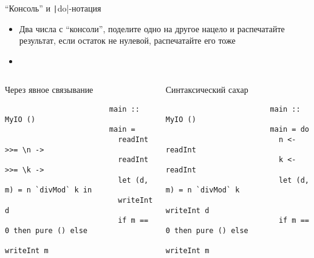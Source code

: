     \begin{frame}[fragile]{``Консоль'' и \texttt|do|-нотация}
        \begin{itemize}
            \item[\todo] Два числа с ``консоли'', поделите одно на другое нацело и распечатайте результат, если остаток не нулевой, распечатайте его тоже
            \item[\answer] \pause
        \end{itemize}
        \vspace{-1.7em}
        \begin{columns}[onlytextwidth]
            \begin{column}[t]{0.485\textwidth}
                \pause
                \begin{block}{Через явное связывание}
                    \begin{verbatim}
                        main :: MyIO ()
                        main =
                          readInt >>= \n ->
                          readInt >>= \k ->
                          let (d, m) = n `divMod` k in
                          writeInt d
                          if m == 0 then pure () else
                            writeInt m
                    \end{verbatim}
                \end{block}
            \end{column}\hfill%
            \begin{column}[t]{0.485\textwidth}
                \pause
                \begin{block}{Синтаксический сахар}
                    \begin{verbatim}
                        main :: MyIO ()
                        main = do
                          n <- readInt
                          k <- readInt
                          let (d, m) = n `divMod` k
                          writeInt d
                          if m == 0 then pure () else
                            writeInt m
                    \end{verbatim}
                \end{block}
            \end{column}
        \end{columns}
    \end{frame}


